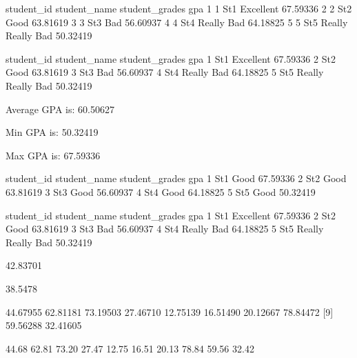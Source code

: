 \documentclass{article}
\begin{document}
\begin{Schunk}
\begin{Soutput}
  student_id student_name    student_grades      gpa
1          1          St1         Excellent 67.59336
2          2          St2              Good 63.81619
3          3          St3               Bad 56.60937
4          4          St4        Really Bad 64.18825
5          5          St5 Really Really Bad 50.32419
\end{Soutput}
\begin{Soutput}
 student_id student_name    student_grades      gpa
          1          St1         Excellent 67.59336
          2          St2              Good 63.81619
          3          St3               Bad 56.60937
          4          St4        Really Bad 64.18825
          5          St5 Really Really Bad 50.32419
\end{Soutput}
\begin{Soutput}
Average GPA is: 	 60.50627
\end{Soutput}
\begin{Soutput}
Min GPA is: 	 50.32419
\end{Soutput}
\begin{Soutput}
Max GPA is: 	 67.59336
\end{Soutput}
\begin{Soutput}
 student_id student_name student_grades      gpa
          1          St1           Good 67.59336
          2          St2           Good 63.81619
          3          St3           Good 56.60937
          4          St4           Good 64.18825
          5          St5           Good 50.32419
\end{Soutput}
\begin{Soutput}
 student_id student_name    student_grades      gpa
          1          St1         Excellent 67.59336
          2          St2              Good 63.81619
          3          St3               Bad 56.60937
          4          St4        Really Bad 64.18825
          5          St5 Really Really Bad 50.32419
\end{Soutput}
\begin{Soutput}
[1] 42.83701
\end{Soutput}
\begin{Soutput}
[1] 38.5478
\end{Soutput}
\begin{Soutput}
 [1] 44.67955 62.81181 73.19503 27.46710 12.75139 16.51490 20.12667 78.84472
 [9] 59.56288 32.41605
\end{Soutput}
\begin{Soutput}
 [1] 44.68 62.81 73.20 27.47 12.75 16.51 20.13 78.84 59.56 32.42
\end{Soutput}
\end{Schunk}
\end{document}
